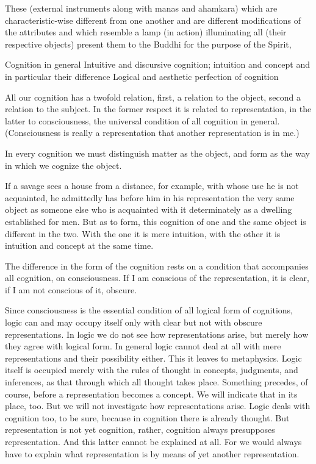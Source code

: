 These (external instruments along with manas and ahamkara)
which are characteristic-wise different from one another
and are different modifications of the attributes
and which resemble a lamp (in action) illuminating all (their respective objects)
present them to the Buddhi for the purpose of the Spirit,

Cognition in general
Intuitive and discursive cognition;
intuition and concept and in particular their difference
Logical and aesthetic perfection of cognition

All our cognition has a twofold relation,
first, a relation to the object,
second a relation to the subject.
In the former respect it is related to representation,
in the latter to consciousness,
the universal condition of all cognition in general.
(Consciousness is really a representation that
another representation is in me.)

In every cognition we must distinguish
matter as the object, and
form as the way in which we cognize the object.

    If a savage sees a house from a distance, for example,
    with whose use he is not acquainted, he admittedly
    has before him in his representation the very same object as
    someone else who is acquainted with it determinately
    as a dwelling established for men.
    But as to form, this cognition of one and the same object is different in the two.
    With the one it is mere intuition,
    with the other it is intuition and concept at the same time.

The difference in the form of the cognition rests on
a condition that accompanies all cognition, on consciousness.
If I am conscious of the representation, it is clear,
if I am not conscious of it, obscure.

    Since consciousness is the essential condition of all logical form of cognitions,
    logic can and may occupy itself only with clear but not with obscure representations.
    In logic we do not see how representations arise,
    but merely how they agree with logical form.
    In general logic cannot deal at all with mere representations and
    their possibility either. This it leaves to metaphysics.
    Logic itself is occupied merely with
    the rules of thought in concepts, judgments, and inferences,
    as that through which all thought takes place.
    Something precedes, of course, before a representation becomes a concept.
    We will indicate that in its place, too.
    But we will not investigate how representations arise.
    Logic deals with cognition too, to be
    sure, because in cognition there is already thought.
    But representation is not yet cognition, rather,
    cognition always presupposes representation.
    And this latter cannot be explained at all.
    For we would always have to explain what representation is
    by means of yet another representation.

